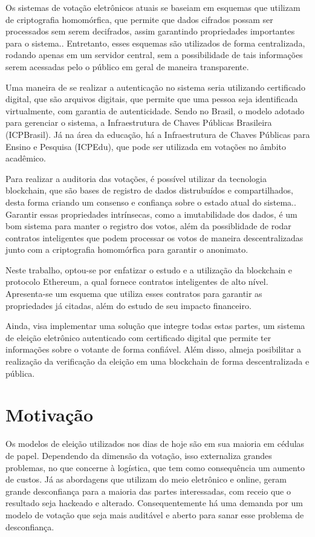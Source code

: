 \documentclass{ufsctex/ufsctex}
\begin{document}
Os sistemas de votação eletrônicos atuais se baseiam em esquemas que utilizam de criptografia
homomórfica, que permite que dados cifrados possam ser processados sem serem decifrados, assim
garantindo propriedades importantes para o sistema.\cite{springer}. Entretanto, esses esquemas
são utilizados de forma centralizada, rodando apenas em um servidor central, sem a possibilidade
de tais informações serem acessadas pelo o público em geral de maneira transparente.

Uma maneira de se realizar a autenticação no sistema seria utilizando certificado
digital, que são arquivos digitais, que permite que uma pessoa seja identificada
virtualmente, com garantia de autenticidade\cite{pki}. Sendo no Brasil, o modelo adotado para
gerenciar o sistema, a Infraestrutura de Chaves Públicas Brasileira (ICPBrasil). Já na área
da educação, há a Infraestrutura de Chaves Públicas para Ensino e Pesquisa (ICPEdu), que
pode ser utilizada em votações no âmbito acadêmico.

Para realizar a auditoria das votações, é possível utilizar da tecnologia
blockchain, que são bases de registro de dados distrubuídos e compartilhados,
desta forma criando um consenso e confiança sobre o estado atual do sistema.\cite{nakamoto2012bitcoin}.
Garantir essas propriedades intrínsecas, como a imutabilidade dos
dados, é um bom sistema para manter o registro dos votos, além da possiblidade de rodar
contratos inteligentes que podem processar os votos de maneira descentralizadas junto
com a criptografia homomórfica para garantir o anonimato.

Neste trabalho, optou-se por enfatizar o estudo e a utilização da blockchain e protocolo
Ethereum, a qual fornece contratos inteligentes de alto nível\cite{ethereum}.
Apresenta-se um esquema que utiliza esses contratos para garantir as propriedades já citadas,
além do estudo de seu impacto financeiro.

Ainda, visa implementar uma solução que integre todas estas partes, um sistema
de eleição eletrônico autenticado com certificado digital que permite ter informações
sobre o votante de forma confiável. Além disso, almeja posibilitar a realização da verificação
da eleição em uma blockchain de forma descentralizada e pública.

\section{Motivação}

Os modelos de eleição utilizados nos dias de hoje são em sua maioria em cédulas
de papel. Dependendo da dimensão da votação, isso externaliza grandes problemas,
no que concerne à logística, que tem como consequência um aumento de custos. Já
as abordagens que utilizam do meio eletrônico e online, geram grande desconfiança
para a maioria das partes interessadas, com receio que o resultado seja hackeado
e alterado. Consequentemente há uma demanda por um modelo de votação que seja
mais auditável e aberto para sanar esse problema de desconfiança.
\end{document}
